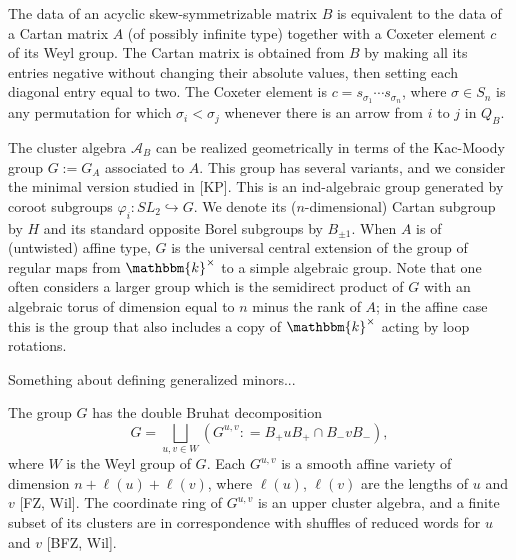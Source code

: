 \documentclass[12pt]{amsart}
\newcommand{\sayHW}[1]{\say[HW]{\color{violet}{\bf HW:}\;#1}}
\newcommand{\cA}{\mathcal{A}}
\newcommand{\kk}{\mathbbm{k}}
\newcommand\into{\hookrightarrow}
\numberwithin{equation}{section}
\begin{document}
The data of an acyclic skew-symmetrizable matrix $B$ is equivalent to the data of a Cartan matrix $A$ (of possibly infinite type) together with a Coxeter element $c$ of its Weyl group. The Cartan matrix is obtained from $B$ by making all its entries negative without changing their absolute values, then setting each diagonal entry equal to two. The Coxeter element is $c = s_{\sigma_1} \cdots s_{\sigma_n}$, where $\sigma \in S_n$ is any permutation for which $\sigma_i < \sigma_j$ whenever there is an arrow from $i$ to $j$ in $Q_B$. \sayHW{$j$ to $i$?}

The cluster algebra $\cA_B$ can be realized geometrically in terms of the Kac-Moody group $G := G_A$ associated to $A$. This group has several variants, and we consider the minimal version studied in [KP]. This is an ind-algebraic group generated by coroot subgroups $\varphi_i: SL_2 \into G$. We denote its ($n$-dimensional) Cartan subgroup by $H$ and its standard opposite Borel subgroups by $B_{\pm 1}$. When $A$ is of (untwisted) affine type, $G$ is the universal central extension of the group of regular maps from $\kk^\times$ to a simple algebraic group. Note that one often considers a larger group which is the semidirect product of $G$ with an algebraic torus of dimension equal to $n$ minus the rank of $A$; in the affine case this is the group that also includes a copy of $\kk^\times$ acting by loop rotations. 

Something about defining generalized minors...

The group $G$ has the double Bruhat decomposition
\[
G = \bigsqcup_{u,v \in W} ( G^{u,v} : = B_+ u B_+ \cap B_- v B_- ),
\]
where $W$ is the Weyl group of $G$. Each $G^{u,v}$ is a smooth affine variety of dimension $n + \ell(u) + \ell(v)$, where $\ell(u)$, $\ell(v)$ are the lengths of $u$ and $v$ [FZ, Wil]. The coordinate ring of $G^{u,v}$ is an upper cluster algebra, and a finite subset of its clusters are in correspondence with shuffles of reduced words for $u$ and $v$ [BFZ, Wil]. 

\end{document}
